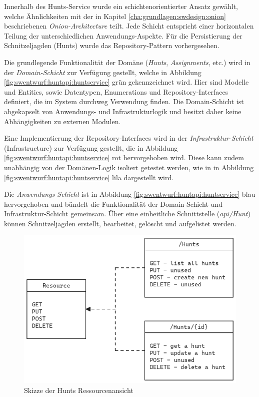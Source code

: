 Innerhalb des Hunts-Service wurde ein schichtenorientierter Ansatz gewählt, welche Ähnlichkeiten mit der in Kapitel \ref{cha:grundlagen:swdesign:onion} beschriebenen \textit{Onion-Architecture} teilt. Jede Schicht entspricht einer horizontalen Teilung der unterschiedlichen Anwendungs-Aspekte. Für die Persistierung der Schnitzeljagden (Hunts) wurde das Repository-Pattern vorhergesehen.

Die grundlegende Funktionalität der Domäne (\textit{Hunts}, \textit{Assignments}, etc.) wird in der \textit{Domain-Schicht} zur Verfügung gestellt, welche in Abbildung \ref{fig:swentwurf:huntapi:huntservice} grün gekennzeichnet wird. Hier sind Modelle und Entities, sowie Datentypen, Enumerations und Repository-Interfaces definiert, die im System durchweg Verwendung finden. Die Domain-Schicht ist abgekapselt von Anwendungs- und Infrastrukturlogik und besitzt daher keine Abhängigkeiten zu externen Modulen.

Eine Implementierung der Repository-Interfaces wird in der \textit{Infrastruktur-Schicht} (Infrastructure) zur Verfügung gestellt, die in Abbildung \ref{fig:swentwurf:huntapi:huntservice} rot hervorgehoben wird. Diese kann zudem unabhängig von der Domänen-Logik isoliert getestet werden, wie in in Abbildung \ref{fig:swentwurf:huntapi:huntservice} lila dargestellt wird.

Die \textit{Anwendungs-Schicht} ist in Abbildung \ref{fig:swentwurf:huntapi:huntservice} blau hervorgehoben und bündelt die Funktionalität der Domain-Schicht und Infrastruktur-Schicht gemeinsam. Über eine einheitliche Schnittstelle (\textit{api/Hunt}) können Schnitzeljagden erstellt, bearbeitet, gelöscht und aufgelistet werden.

\begin{figure}[H]
    \centering
    \includegraphics[width=\textwidth]{images/PrAr-Software-Entwurf-Hunt-Api-Hunt-Service-Endpoints.png}
    \caption{Skizze der Hunts Ressourcenansicht}
    \label{fig:swentwurf:huntapi:huntservice:endpoints}
\end{figure}

